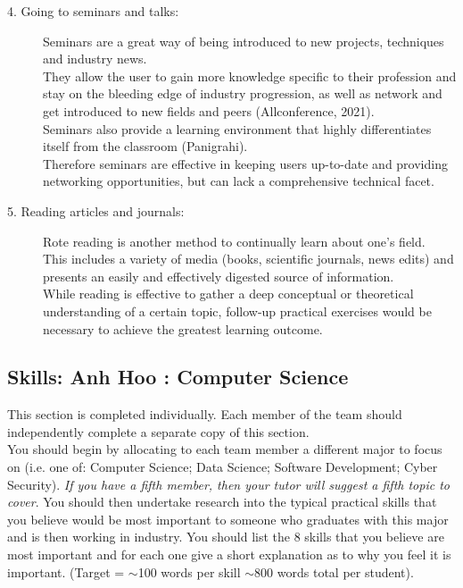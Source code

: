 \documentclass[a4paper, 11pt]{report}
\begin{document}
\begin{description}
\item [4. Going to seminars and talks:] Seminars are a great way of being introduced to new projects, techniques and industry news.
\\They allow the user to gain more knowledge specific to their profession and stay on the bleeding edge of industry progression, as well as network and get introduced to new fields and peers (Allconference, 2021). 
\\Seminars also provide a learning environment that highly differentiates itself from the classroom (Panigrahi). 
\\Therefore seminars are effective in keeping users up-to-date and providing networking opportunities, but can lack a comprehensive technical facet.

\item [5. Reading articles and journals:] Rote reading is another method to continually learn about one's field. 
\\This includes a variety of media (books, scientific journals, news edits) and presents an easily and effectively digested source of information.
\\While reading is effective to gather a deep conceptual or theoretical understanding of a certain topic, follow-up practical exercises would be necessary to achieve the greatest learning outcome. 


\end{description}


\subsection{Skills: Anh Hoo : Computer Science}

This section is completed individually. Each member of the team should independently complete a separate copy of this section.\\
You should begin by allocating to each team member a different major to focus on (i.e. one of: Computer Science; Data Science; Software Development; Cyber Security). \textit{If you have a fifth member, then your tutor will suggest a fifth topic to cover}. You should then undertake research into the typical practical skills that you believe would be most important to someone who graduates with this major and is then working in industry. You should list the 8 skills that you believe are most important and for each one give a short explanation as to why you feel it is important. (Target = $\sim$100 words per skill $\sim$800 words total per student).
\end{document}
